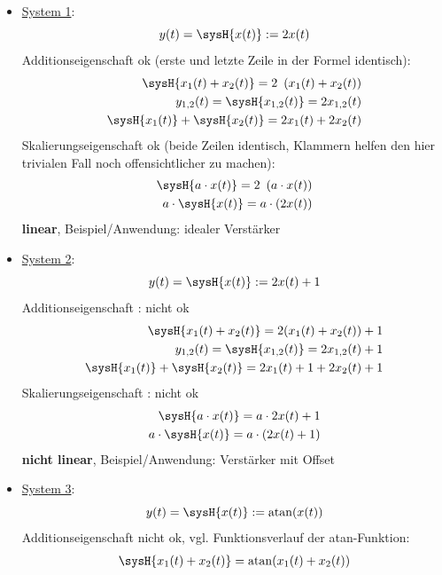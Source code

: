 \begin{Loesung}
\begin{itemize}
\item  \underline{System 1}:
\begin{equation}
y(t) = \sysH{x(t)}:=2 x(t)
\end{equation}
Additionseigenschaft ok (erste und letzte Zeile in der Formel identisch):
\begin{align}
\sysH{x_1(t)+x_2(t)}=2\,\,\,(x_1(t) + x_2(t))\\
y_{1,2}(t) = \sysH{x_{1,2}(t)}=2 x_{1,2}(t)\\
\sysH{x_1(t)} + \sysH{x_2(t)} = 2 x_1(t) + 2 x_2(t)
\end{align}
Skalierungseigenschaft ok (beide Zeilen identisch, Klammern helfen den hier trivialen
Fall noch offensichtlicher zu machen):
\begin{align}
\sysH{a \cdot x(t)}= 2\,\,\,( a \cdot x(t))\\
a \cdot \sysH{x(t)}=  a \cdot (2 x(t))
\end{align}
\textbf{linear}, Beispiel/Anwendung: idealer Verstärker
\item  \underline{System 2}:
\begin{equation}
y(t) = \sysH{x(t)}:= 2 x(t) + 1
\end{equation}
Additionseigenschaft : nicht ok
\begin{align}
\sysH{x_1(t)+x_2(t)}= 2(x_1(t)+x_2(t)) + 1\\
y_{1,2}(t) = \sysH{x_{1,2}(t)}= 2 x_{1,2}(t) + 1\\
\sysH{x_1(t)} + \sysH{x_2(t)} = 2 x_{1}(t) + 1 + 2 x_{2}(t) + 1
\end{align}
Skalierungseigenschaft : nicht ok
\begin{align}
\sysH{a \cdot x(t)}= a \cdot 2 x(t) + 1\\
a \cdot \sysH{x(t)}= a \cdot (2 x(t) + 1)
\end{align}
\textbf{nicht linear}, Beispiel/Anwendung: Verstärker mit Offset
\item  \underline{System 3}:
\begin{equation}
y(t) = \sysH{x(t)}:= \mathrm{atan}(x(t))
\end{equation}
Additionseigenschaft nicht ok, vgl. Funktionsverlauf der atan-Funktion:
\begin{align}
\sysH{x_1(t)+x_2(t)}=\mathrm{atan}(x_1(t)+x_2(t))\\

\end{align}
\end{itemize}
\end{Loesung}

